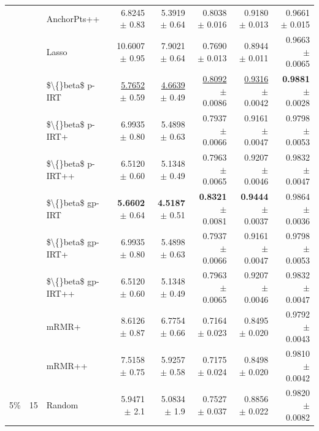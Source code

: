 \begin{longtable}{llp{}rrrrr}
 &  & AnchorPts++ & 6.8245 {\scriptsize $\pm$ 0.83} & 5.3919 {\scriptsize $\pm$ 0.64} & 0.8038 {\scriptsize $\pm$ 0.016} & 0.9180 {\scriptsize $\pm$ 0.013} & 0.9661 {\scriptsize $\pm$ 0.015} \\
 &  & Lasso & 10.6007 {\scriptsize $\pm$ 0.95} & 7.9021 {\scriptsize $\pm$ 0.64} & 0.7690 {\scriptsize $\pm$ 0.013} & 0.8944 {\scriptsize $\pm$ 0.011} & 0.9663 {\scriptsize $\pm$ 0.0065} \\
 &  & \$\textbackslash\{\}beta\$ p-IRT & \underline{5.7652} {\scriptsize $\pm$ 0.59} & \underline{4.6639} {\scriptsize $\pm$ 0.49} & \underline{0.8092} {\scriptsize $\pm$ 0.0086} & \underline{0.9316} {\scriptsize $\pm$ 0.0042} & \textbf{0.9881} {\scriptsize $\pm$ 0.0028} \\
 &  & \$\textbackslash\{\}beta\$ p-IRT+ & 6.9935 {\scriptsize $\pm$ 0.80} & 5.4898 {\scriptsize $\pm$ 0.63} & 0.7937 {\scriptsize $\pm$ 0.0066} & 0.9161 {\scriptsize $\pm$ 0.0047} & 0.9798 {\scriptsize $\pm$ 0.0053} \\
 &  & \$\textbackslash\{\}beta\$ p-IRT++ & 6.5120 {\scriptsize $\pm$ 0.60} & 5.1348 {\scriptsize $\pm$ 0.49} & 0.7963 {\scriptsize $\pm$ 0.0065} & 0.9207 {\scriptsize $\pm$ 0.0046} & 0.9832 {\scriptsize $\pm$ 0.0047} \\
 &  & \$\textbackslash\{\}beta\$ gp-IRT & \textbf{5.6602} {\scriptsize $\pm$ 0.64} & \textbf{4.5187} {\scriptsize $\pm$ 0.51} & \textbf{0.8321} {\scriptsize $\pm$ 0.0081} & \textbf{0.9444} {\scriptsize $\pm$ 0.0037} & 0.9864 {\scriptsize $\pm$ 0.0036} \\
 &  & \$\textbackslash\{\}beta\$ gp-IRT+ & 6.9935 {\scriptsize $\pm$ 0.80} & 5.4898 {\scriptsize $\pm$ 0.63} & 0.7937 {\scriptsize $\pm$ 0.0066} & 0.9161 {\scriptsize $\pm$ 0.0047} & 0.9798 {\scriptsize $\pm$ 0.0053} \\
 &  & \$\textbackslash\{\}beta\$ gp-IRT++ & 6.5120 {\scriptsize $\pm$ 0.60} & 5.1348 {\scriptsize $\pm$ 0.49} & 0.7963 {\scriptsize $\pm$ 0.0065} & 0.9207 {\scriptsize $\pm$ 0.0046} & 0.9832 {\scriptsize $\pm$ 0.0047} \\
 &  & mRMR+ & 8.6126 {\scriptsize $\pm$ 0.87} & 6.7754 {\scriptsize $\pm$ 0.66} & 0.7164 {\scriptsize $\pm$ 0.023} & 0.8495 {\scriptsize $\pm$ 0.020} & 0.9792 {\scriptsize $\pm$ 0.0043} \\
 &  & mRMR++ & 7.5158 {\scriptsize $\pm$ 0.75} & 5.9257 {\scriptsize $\pm$ 0.58} & 0.7175 {\scriptsize $\pm$ 0.024} & 0.8498 {\scriptsize $\pm$ 0.020} & 0.9810 {\scriptsize $\pm$ 0.0042} \\
\midrule
5\% & 15 & Random & 5.9471 {\scriptsize $\pm$ 2.1} & 5.0834 {\scriptsize $\pm$ 1.9} & 0.7527 {\scriptsize $\pm$ 0.037} & 0.8856 {\scriptsize $\pm$ 0.022} & 0.9820 {\scriptsize $\pm$ 0.0082} \\

\end{longtable}
